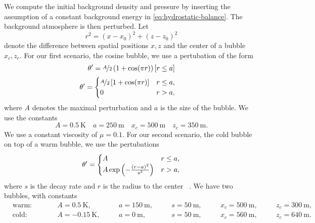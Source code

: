 \documentclass[runningheads]{llncs}
\newcommand{\eqA}{}
\newcommand{\eqB}{(}
\newcommand{\eqMultiA}{(}
\newcommand{\eqMultiB}{)}
\DeclareRobustCommand{\pcrefSingle}[1]{%
\begingroup%
  \renewcommand{\eqA}{(}\renewcommand{\eqB}{}%
\cref{#1}%
\endgroup%
}
\DeclareRobustCommand{\pcrefMulti}[1]{%
\begingroup%
    \renewcommand{\eqMultiA}{}\renewcommand{\eqMultiB}{}%
    (\cref{#1})%
\endgroup%
}
\DeclareRobustCommand{\pcref}[1]{%
\IfSubStr{#1}{,}{\pcrefMulti{#1}}{\pcrefSingle{#1}}%
}
\begin{document}
We compute the initial background density and pressure by inserting the assumption of a constant background energy in \cref{eq:hydrostatic-balance}.
The background atmosphere is then perturbed.
Let
\begin{equation}
  \label{eq:radius}
  r^2 = (x - x_0)^2 + (z - z_0)^2
\end{equation}
denote the difference between spatial positions $x,z$ and the center of a bubble $x_c, z_c$.
For our first scenario, the cosine bubble, we use a pertubation of the form
\begin{equation}
  \label{eq:cos-pertubation-alt}
  \theta' = 
    \nicefrac{A}{2} \left( 1 + \cos(\pi r) \right) \left[ r \leq a \right]
\end{equation}
\begin{align}
  \label{eq:cos-pertubation}
  \theta' &= \begin{cases}
    \nicefrac{A}{2} \left[ 1 + \cos(\pi r) \right] & r \leq a, \\
    0 & r > a,
    \end{cases}
\end{align}
where $A$ denotes the maximal perturbation and $a$ is the size of the bubble.
We use the constants
\begin{equation}\label{eq:cosine-bubble}
  A = \SI{0.5}{\K} \quad a = \SI{250}{\m} \quad x_c = \SI{500}{\m} \quad z_c = \SI{350}{\m}.
\end{equation}
We use a constant viscosity of $\mu = 0.1$.
For our second scenario, the cold bubble on top of a warm bubble, we use the pertubations
\begin{equation}
  \label{eq:bubbles-pertubation}
  \theta' =
  \begin{cases}
    A & r \leq a, \\
    A \exp \left( - \frac{(r-a)^2}{s^2} \right) & r > a,
    \end{cases}
\end{equation}
where $s$ is the decay rate and $r$  is the radius to the center~\pcref{eq:radius}.
We have two bubbles, with constants
\begin{equation}
  \label{eq:bubbles-values}
\begin{alignedat}{6}
  & \text{warm:} \qquad && A = \SI{0.5}{\K}, \quad&& a = \SI{150}{\m}, \quad&& s = \SI{50}{\m}, \quad&& x_c = \SI{500}{\m,} \quad&& z_c = \SI{300}{\m},\\
  & \text{cold:} \qquad && A = \SI{-0.15}{\K}, \quad&& a = \SI{0}{\m}, \quad&& s = \SI{50}{\m}, \quad&& x_c = \SI{560}{\m}, \quad&& z_c = \SI{640}{\m}.
  \end{alignedat}
\end{equation}
\end{document}
